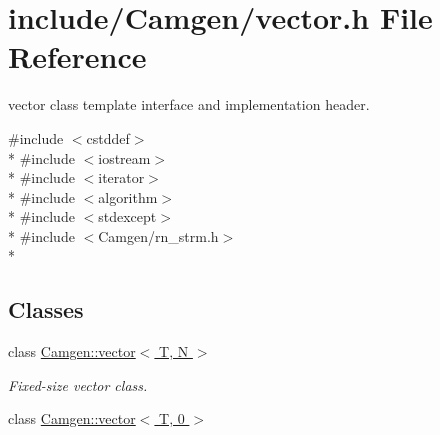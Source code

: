 \hypertarget{a00833}{}\section{include/\+Camgen/vector.h File Reference}
\label{a00833}


vector class template interface and implementation header.  


{\ttfamily \#include $<$cstddef$>$}\\*
{\ttfamily \#include $<$iostream$>$}\\*
{\ttfamily \#include $<$iterator$>$}\\*
{\ttfamily \#include $<$algorithm$>$}\\*
{\ttfamily \#include $<$stdexcept$>$}\\*
{\ttfamily \#include $<$Camgen/rn\+\_\+strm.\+h$>$}\\*
\subsection*{Classes}
\begin{DoxyCompactItemize}
\item 
class \hyperlink{a00579}{Camgen\+::vector$<$ T, N $>$}
\begin{DoxyCompactList}\small\item\em Fixed-\/size vector class. \end{DoxyCompactList}\item 
class \hyperlink{a00580}{Camgen\+::vector$<$ T, 0 $>$}
\end{DoxyCompactItemize}
